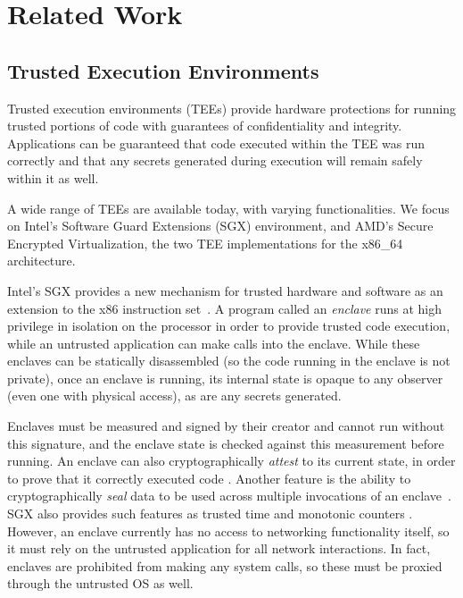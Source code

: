 \section{Related Work}
\label{sec:related}


\subsection{Trusted Execution Environments}

Trusted execution environments (TEEs) provide hardware protections for running
trusted portions of code with guarantees of confidentiality and integrity.  
%
Applications can be guaranteed that code executed within the TEE was run
correctly and that any secrets generated during execution will remain safely
within it as well.

A wide range of TEEs are available today, with varying functionalities.
%
We focus on Intel's Software Guard Extensions (SGX) environment, and AMD's
Secure Encrypted Virtualization, the two TEE implementations for the x86\_64
architecture.


%
Intel's SGX provides a new mechanism for trusted
hardware and software as an extension to the x86 instruction set~\cite{sgx,
mckeen2013innovative}.  
%
A program called an \textit{enclave} runs at high
privilege in isolation on the processor in order to provide trusted code
execution, while an untrusted application can make calls into the enclave.
%
While these enclaves can be statically disassembled (so the code running in the
enclave is not private), once an enclave is running, its internal state is
opaque to any observer (even one with physical access), as are any secrets generated.  


Enclaves must be measured and signed by their creator and cannot run without
this signature, and the enclave state is checked against this measurement
before running.  
%
An enclave can also cryptographically \textit{attest} to its current state, in
order to prove that it correctly executed code \cite{sgx_provisioning,
anati2013innovative}.  
%
Another feature is the ability to cryptographically \textit{seal} data to be
used across multiple invocations of an enclave~\cite{anati2013innovative,
sgx_sealing}.  
%
SGX also provides such features as trusted time and monotonic counters
\cite{sgx-linux-sdk,sgx-trusted-time}.  
%
However, an enclave currently has no access to networking functionality itself,
so it must rely on the untrusted application for all network interactions.  
%
In fact, enclaves are prohibited from making any system calls, so these must be
proxied through the untrusted OS as well.

